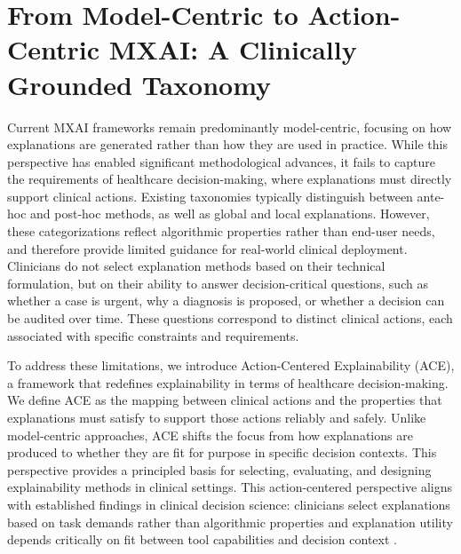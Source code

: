 \documentclass[pdflatex,sn-mathphys-num]{sn-jnl}%
\theoremstyle{thmstyleone}%
\theoremstyle{thmstyletwo}%
\theoremstyle{thmstylethree}%
\begin{document}
\section{From Model-Centric to Action-Centric MXAI: A Clinically Grounded Taxonomy}
Current MXAI frameworks remain predominantly model-centric, focusing on how explanations are generated rather than how they are used in practice. While this perspective has enabled significant methodological advances, it fails to capture the requirements of healthcare decision-making, where explanations must directly support clinical actions.
Existing taxonomies typically distinguish between ante-hoc and post-hoc methods, as well as global and local explanations.
However, these categorizations reflect algorithmic properties rather than end-user needs, and therefore provide limited guidance for real-world clinical deployment.
Clinicians do not select explanation methods based on their technical formulation, but on their ability to answer decision-critical questions, such as whether a case is urgent, why a diagnosis is proposed, or whether a decision can be audited over time.
These questions correspond to distinct clinical actions, each associated with specific constraints and requirements.

\label{sec:action-centric-taxonomy}
To address these limitations, we introduce Action-Centered Explainability (ACE), a framework that redefines explainability in terms of healthcare decision-making.
We define ACE as the mapping between clinical actions and the properties that explanations must satisfy to support those actions reliably and safely. Unlike model-centric approaches, ACE shifts the focus from how explanations are produced to whether they are fit for purpose in specific decision contexts. This perspective provides a principled basis for selecting, evaluating, and designing explainability methods in clinical settings.
This action-centered perspective aligns with established findings in clinical decision science: clinicians select explanations based on task demands rather than algorithmic properties \cite{pmlr-v106-tonekaboni19a,gniadek2023framework} and explanation utility depends critically on fit between tool capabilities and decision context \cite{rieff2025smmileexpertdrivenbenchmarkmultimodal}.
\end{document}
